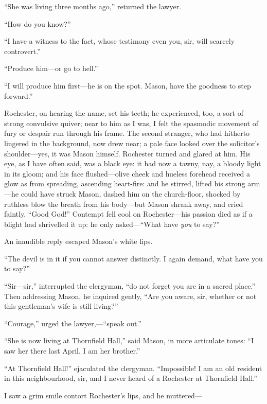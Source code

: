 \enquote{She was living three months ago,} returned the lawyer.

\enquote{How do you know?}

\enquote{I have a witness to the fact, whose testimony even you, sir,
	will scarcely controvert.}

\enquote{Produce him---or go to hell.}

\enquote{I will produce him first---he is on the spot. \Mr{} Mason, have
	the goodness to step forward.}

\Mr{} Rochester, on hearing the name, set his teeth; he experienced, too,
a sort of strong convulsive quiver; near to him as I was, I felt the
spasmodic movement of fury or despair run through his frame. The second
stranger, who had hitherto lingered in the background, now drew near; a
pale face looked over the solicitor's shoulder---yes, it was Mason
himself. \Mr{} Rochester turned and glared at him. His eye, as I have
often said, was a black eye: it had now a tawny, nay, a bloody light in
its gloom; and his face flushed---olive cheek and hueless forehead
received a glow as from spreading, ascending heart-fire: and he stirred,
lifted his strong arm---he could have struck Mason, dashed him on the
church-floor, shocked by ruthless blow the breath from his body---but
Mason shrank away, and cried faintly, \enquote{Good God!} Contempt fell
cool on \Mr{} Rochester---his passion died as if a blight had shrivelled
it up: he only asked---\enquote{What have \emph{you} to say?}

An inaudible reply escaped Mason's white lips.

\enquote{The devil is in it if you cannot answer distinctly. I again
	demand, what have you to say?}

\enquote{Sir---sir,} interrupted the clergyman, \enquote{do not forget
	you are in a sacred place.} Then addressing Mason, he inquired gently,
\enquote{Are you aware, sir, whether or not this gentleman's wife is
	still living?}

\enquote{Courage,} urged the lawyer,---\enquote{speak out.}

\enquote{She is now living at Thornfield Hall,} said Mason, in more
articulate tones: \enquote{I saw her there last April. I am her
	brother.}

\enquote{At Thornfield Hall!} ejaculated the clergyman.
\enquote{Impossible! I am an old resident in this neighbourhood, sir,
	and I never heard of a \Mrs{} Rochester at Thornfield Hall.}

I saw a grim smile contort \Mr{} Rochester's lips, and he muttered---

